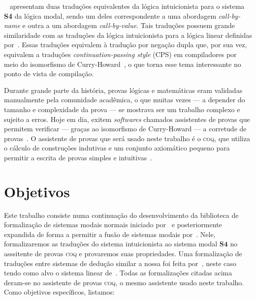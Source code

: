     \vspace{.5\baselineskip}
    ~\cite{Troelstra} apresentam duas traduções equivalentes da lógica intuicionista para o sistema \textbf{S4} da lógica modal, sendo um deles correspondente a uma abordagem \textit{call-by-name} e outra a um abordagem \textit{call-by-value}. Tais traduções possuem grande similaridade com as traduções da lógica intuicionista para a lógica linear definidas por~\cite{Girard}. Essas traduções equivalem à tradução por negação dupla que, por sua vez, equivalem a traduções \textit{continuation-passing style} (CPS) em compiladores por meio do isomorfismo de Curry-Howard~\citep{Reynolds}, o que torna esse tema interessante no ponto de vista de compilação.

    Durante grande parte da história, provas lógicas e matemáticas eram validadas manualmente pela comunidade acadêmica, o que muitas vezes --- a depender do tamanho e complexidade da prova --- se mostrava ser um trabalho complexo e sujeito a erros. Hoje em dia, exitem \textit{softwares} chamados assistentes de provas que permitem verificar --- graças ao isomorfismo de Curry-Howard --- a corretude de provas~\citep{Chlipala}. O assistente de provas que será usado neste trabalho é o \textsc{coq}, que utiliza o cálculo de construções indutivas e um conjunto axiomático pequeno para permitir a escrita de provas simples e intuitivas~\citep{Coq}.

    \section{Objetivos}
    Este trabalho consiste numa continuação do desenvolvimento da biblioteca de formalização de sistemas modais normais iniciado por~\cite{Silveira} e posteriormente expandida de forma a permitir a fusão de sistemas modais por~\cite{Nunes}. Nele, formalizaremos as traduções do sistema intuicionista ao sistema modal $\mathbf{S4}$ no asssitente de provas \textsc{coq} e provaremos suas propriedades. Uma formalização de traduções entre sistemas de dedução similar a nossa foi feita por~\cite{Sehnem}, neste caso tendo como alvo o sistema linear de~\cite{Girard}. Todas as formalizações citadas acima deram-se no assistente de provas \textsc{coq}, o mesmo assistente usado neste trabalho. Como objetivos específicos, listamos:

